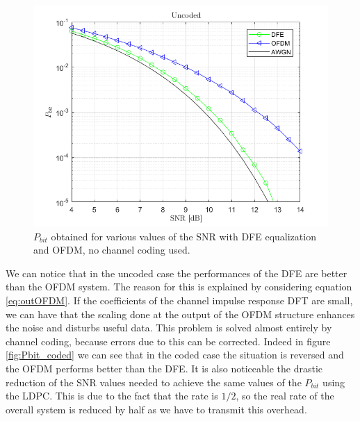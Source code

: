 \documentclass[a4paper,11.5pt]{article}
\begin{document}
\begin{figure}[H]
	\begin{center}   
		\includegraphics[width=\textwidth]{figs/Pbit_uncoded_1.png} 
		\caption{$P_{bit}$ obtained for various values of the SNR with DFE equalization and OFDM, no channel coding used.}
		\label{fig:Pbit_uncoded}
	\end{center}
\end{figure}

We can notice that in the uncoded case the performances of the DFE are better than the OFDM system. The reason for this is explained by considering equation \ref{eq:outOFDM}. If the coefficients of the channel impulse response DFT are small, we can have that the scaling done at the output of the OFDM structure enhances the noise and disturbs useful data. This problem is solved almost entirely by channel coding, because errors due to this can be corrected. Indeed in figure \ref{fig:Pbit_coded} we can see that in the coded case the situation is reversed and the OFDM performs better than the DFE.
It is also noticeable the drastic reduction of the SNR values needed to achieve the same values of the $P_{bit}$ using the LDPC. This is due to the fact that the rate is $1/2$, so the real rate of the overall system is reduced by half as we have to transmit this overhead.
\end{document}
